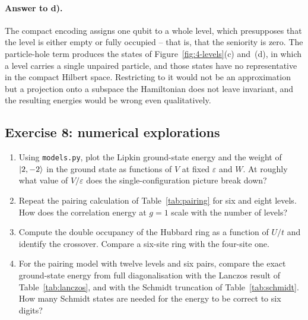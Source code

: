 \paragraph{Answer to d).}
The compact encoding assigns one qubit to a whole level, which presupposes
that the level is either empty or fully occupied -- that is, that the
seniority is zero.  The particle-hole term produces the states of
Figure~\ref{fig:4-levels}(c) and~(d), in which a level carries a single
unpaired particle, and those states have no representative in the compact
Hilbert space.  Restricting to it would not be an approximation but a
projection onto a subspace the Hamiltonian does not leave invariant, and the
resulting energies would be wrong even qualitatively.

\subsection*{Exercise 8: numerical explorations}

\begin{enumerate}
  \item[a)] Using \texttt{models.py}, plot the Lipkin ground-state energy and
  the weight of $\vert 2,-2 \rangle$ in the ground state as functions of $V$ at fixed
  $\varepsilon$ and $W$.  At roughly what value of $V/\varepsilon$ does the
  single-configuration picture break down?
  \item[b)] Repeat the pairing calculation of Table~\ref{tab:pairing} for six
  and eight levels.  How does the correlation energy at $g=1$ scale with the
  number of levels?
  \item[c)] Compute the double occupancy of the Hubbard ring as a function of
  $U/t$ and identify the crossover.  Compare a six-site ring with the
  four-site one.
  \item[d)] For the pairing model with twelve levels and six pairs, compare
  the exact ground-state energy from full diagonalisation with the Lanczos
  result of Table~\ref{tab:lanczos}, and with the Schmidt truncation of
  Table~\ref{tab:schmidt}.  How many Schmidt states are needed for the energy
  to be correct to six digits?
\end{enumerate}
